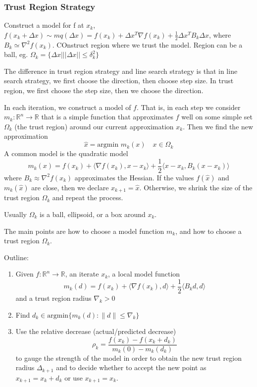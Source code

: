 \subsubsection{Trust Region Strategy}
\begin{problem}
  Construct a model for f at $x_k$, $f(x_k+\Delta x)\sim mq(\Delta x)=f(x_k)+\Delta x^T\nabla f(x_k)+\frac{1}{2}\Delta x^TB_k\Delta x$,
  where $B_k\simeq \nabla^2 f(x_k)$. COnstruct region where we trust the model. Region can be a ball,
  eg. $\Omega_k=\{\Delta x| ||\Delta x||\leq \delta_k^2\}$
\end{problem}
The difference in trust region strategy and line search strategy is that in line search strategy, we first choose the direction, then choose step size. In trust region, we first choose the step size, then we choose the direction.
\begin{definition}
  In each iteration, we construct a model of $f$. That is, in each step we consider $m_k: \mathbb R^n \to \mathbb R$ that is a simple function that approximates $f$ well on some simple set $\Omega_k$ (the trust region) around our current approximation $x_k$. Then we find the new approximation $$\hat x = \text{argmin } m_k(x) \quad \text{$x \in \Omega_k$}$$
  A common model is the quadratic model $$m_k(x) = f(x_k) + \langle \nabla f(x_k), x - x_k \rangle + \frac{1}{2} \langle x - x_k, B_k(x - x_k) \rangle$$ where $B_k \approx \nabla^2 f(x_k)$ approximates the Hessian. If the values $f(\hat x)$ and $m_k(\hat x)$ are close, then we declare $x_{k+1} = \hat x$. Otherwise, we shrink the size of the trust region $\Omega_k$ and repeat the process.

  Usually $\Omega_k$ is a ball, ellipsoid, or a box around $x_k$.

  The main points are how to choose a model function $m_k$, and how to choose a trust region $\Omega_k$.
\end{definition}
\begin{theorem}
    Outline:
    \begin{enumerate}
        \item Given $f: \mathbb R^n \to \mathbb R$, an iterate $x_k$, a local model function $$m_k(d) = f(x_k) + \langle \nabla f(x_k), d \rangle + \frac{1}{2} \langle B_kd, d \rangle$$
        and a trust region radius $\nabla_k > 0$
        \item Find $d_k \in \text{argmin} \{m_k(d) : \|d\| \leq \nabla_k\}$
        \item Use the relative decrease (actual/predicted decrease)
        $$\rho_k = \frac{f(x_k) - f(x_k + d_k)}{m_k(0) - m_k(d_k)}$$ to gauge the strength of the model in order to obtain the new trust region radius $\Delta_{k+1}$ and to decide whether to accept the new point as $x_{k+1} = x_k + d_k$ or use $x_{k+1} = x_k$.
    \end{enumerate}
\end{theorem}





